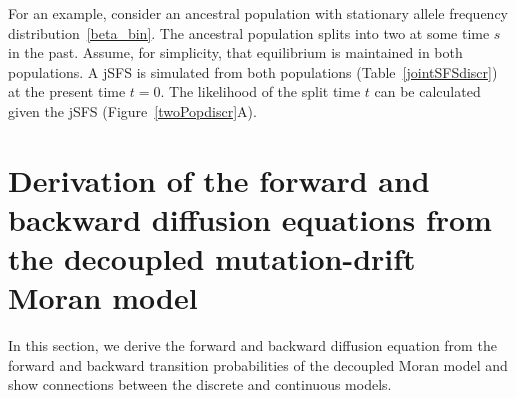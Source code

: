 \documentclass[preprint]{elsarticle}
\begin{document}

For an example, consider an ancestral population with stationary allele frequency distribution~\eqref{beta_bin}. The ancestral population splits into two at some time $s$ in the past. Assume, for simplicity, that equilibrium is maintained in both populations. A jSFS is simulated from both populations (Table~\ref{jointSFSdiscr}) at the present time $t=0$. The likelihood of the split time $t$ can be calculated given the jSFS (Figure~\ref{twoPopdiscr}A).


\section{Derivation of the forward and backward diffusion equations from the decoupled mutation-drift Moran model}

In this section, we derive the forward and backward diffusion equation from the forward and backward transition probabilities of the decoupled Moran model and show connections between the discrete and continuous models.
\end{document}
